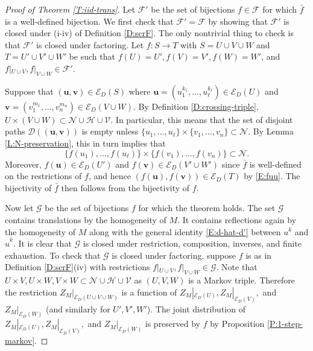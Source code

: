 \documentclass[aop, preprint]{imsart}
\theoremstyle{plain}
\theoremstyle{definition}
\theoremstyle{plain}
\newcommand{\sset}{\subset}
\newcommand{\scrE}{\mathcal{E}}
\newcommand{\scrD}{\mathcal{D}}
\newcommand{\scrG}{\mathcal{G}}
\newcommand{\scrV}{\mathcal{V}}
\newcommand{\scrH}{\mathcal{H}}
\newcommand{\scrN}{\mathcal{N}}
\newcommand{\scrF}{\mathcal{F}}
\newcommand{\X}{\times}
\newcommand{\bu}{\mathbf{u}}
\newcommand{\bv}{\mathbf{v}}
\begin{document}
\begin{proof}[Proof of Theorem \ref{T:iid-trans}]
	Let $\scrF'$ be the set of bijections $f \in \scrF$ for which $\bar f$ is a well-defined bijection. We first check that $\scrF' = \scrF$ by showing that $\scrF'$ is closed under (i-iv) of Definition \ref{D:scrF}. The only nontrivial thing to check is that $\scrF'$ is closed under factoring. Let $f:S \to T$ with $S = U \cup V \cup W$ and $T = U' \cup V' \cup W'$ be such that $f(U) = U', f(V) = V', f(W) = W'$, and $f|_{U \cup V}, f|_{V \cup W} \in \scrF'$. 
	
	Suppose that $(\bu, \bv) \in \scrE_D(S)$ where $\bu = (u_1^{k_1}, \dots, u_\ell^{k_\ell}) \in \scrE_D(U)$ and $\bv = (v_1^{m_1}, \dots, v_n^{m_n}) \in \scrE_D(V \cup W)$. By Definition \ref{D:crossing-triple}, $U \X (V \cup W) \sset \scrN \cup \scrH \cup \scrV$. In particular, this means that the set of disjoint paths $\scrD((\bu, \bv))$ is empty unless $\{u_1, \dots, u_\ell\} \X \{v_1, \dots, v_n\} \sset \scrN.$ By Lemma \ref{L:N-preservation}, this in turn implies that 
	\begin{equation}
	\label{E:fuu}
	\{f(u_1), \dots, f(u_\ell)\} \X \{f(v_1), \dots, f(v_n)\} \sset \scrN.
	\end{equation}
	Moreover, $f(\bu) \in \scrE_D(U')$ and $f(\bv) \in \scrE_D(V' \cup W')$ since $\bar f$ is well-defined on the restrictions of $f$, and hence $(f(\bu), f(\bv)) \in \scrE_D(T)$ by \eqref{E:fuu}. The bijectivity of $\bar f$ then follows from the bijectivity of $f$.
	
	Now let $\scrG$ be the set of bijections $f$ for which the theorem holds. The set $\scrG$ contains translations by the homogeneity of $M$. It contains reflections again by the homogeneity of $M$ along with the general identity \eqref{E:d-hat-d'} between $u^k$ and $\hat u^k$. It is clear that $\scrG$ is closed under restriction, composition, inverses, and finite exhaustion. To check that $\scrG$ is closed under factoring, suppose $f$ is as in Definition \ref{D:scrF}(iv) with restrictions $f|_{U \cup V}, f|_{V \cup W} \in \scrG$. Note that $U \X V, U \X W, V \X W \sset \scrN \cup \scrH \cup \scrV$ as $(U, V, W)$ is a Markov triple. Therefore the restriction $Z_M|_{\scrE_D(U \cup V \cup W)}$ is a function of $Z_M|_{\scrE_D(U)}, Z_M|_{\scrE_D(V)},$ and $Z_M|_{\scrE_D(W)}$ (and similarly for $U', V', W'$). The joint distribution of $Z_M|_{\scrE_D(U)}, Z_M|_{\scrE_D(V)},$ and $Z_M|_{\scrE_D(W)}$ is preserved by $f$ by Proposition \ref{P:1-step-markov}.
\end{proof}
\end{document}
